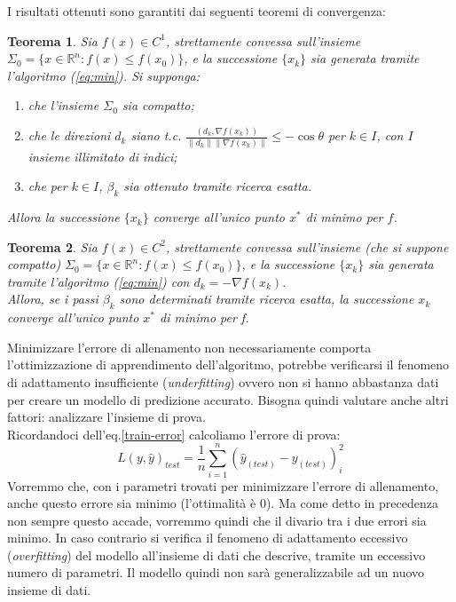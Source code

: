 \documentclass[a4paper,12pt,oneside]{book}
\begin{document}
I risultati ottenuti sono garantiti dai seguenti teoremi di convergenza:
\newtheorem{teo}{Teorema}
\begin{teo}
Sia $f(x)\in C^{1}$, strettamente convessa sull'insieme\\ $\Sigma_{0}=\{x\in\mathbb{R}^{n}:f(x)\leq f(x_{0})\}$, e la successione $\{x_{k}\}$ sia generata tramite l'algoritmo (\ref{eq:min}). Si supponga:
\begin{enumerate}
\item che l'insieme $\Sigma_{0}$ sia compatto;
\item che le direzioni $d_{k}$ siano t.c. $\frac{(d_{k},\nabla f(x_{k}))}{\parallel d_{k} \parallel \parallel \nabla f(x_{k})\parallel}\leq - \cos \theta$ per $k\in \textit{I}$, con $\textit{I}$ insieme illimitato di indici;
\item che per $k\in \textit{I}$, $\beta_{k}$ sia ottenuto tramite ricerca esatta.
\end{enumerate}
Allora la successione $\{x_{k}\}$ converge all'unico punto $x^{*}$ di minimo per $f$.
\end{teo}
\begin{teo}
Sia $f(x)\in C^{2}$, strettamente convessa sull'insieme (che si suppone compatto) $\Sigma_{0}=\{x\in\mathbb{R}^{n}:f(x)\leq f(x_{0})\}$, e la successione $\{x_{k}\}$ sia generata tramite l'algoritmo (\ref{eq:min}) con $d_{k}=-\nabla f(x_{k})$.\\
Allora, se i passi $\beta_{k}$ sono determinati tramite ricerca esatta, la successione $x_{k}$ converge all'unico punto $x^{*}$ di minimo per f.
\end{teo}
Minimizzare l'errore di allenamento non necessariamente comporta l'ottimizzazione di apprendimento dell'algoritmo, potrebbe verificarsi il fenomeno di adattamento insufficiente (\textit{underfitting}) ovvero non si hanno abbastanza dati per creare un modello di predizione accurato. Bisogna quindi valutare anche altri fattori: analizzare l'insieme di prova.\\
Ricordandoci dell'eq.\ref{train-error} calcoliamo l'errore di prova:
\begin{equation}\label{test-error}
L(y,\hat{y})_{test}=\frac{1}{n}\sum_{i=1}^{n}(\hat{y}_{(test)}-y_{(test)})_{i}^2
\end{equation}
Vorremmo che, con i parametri trovati per minimizzare l'errore di allenamento, anche questo errore sia minimo (l'ottimalit\`{a} \`e 0). Ma come detto in precedenza non sempre questo accade, vorremmo quindi che il divario tra i due errori sia minimo. In caso contrario si verifica il fenomeno di adattamento eccessivo (\textit{overfitting}) del modello all'insieme di dati che descrive, tramite un eccessivo numero di parametri. Il modello quindi non sar\`{a} generalizzabile ad un nuovo insieme di dati.\\
\end{document}
